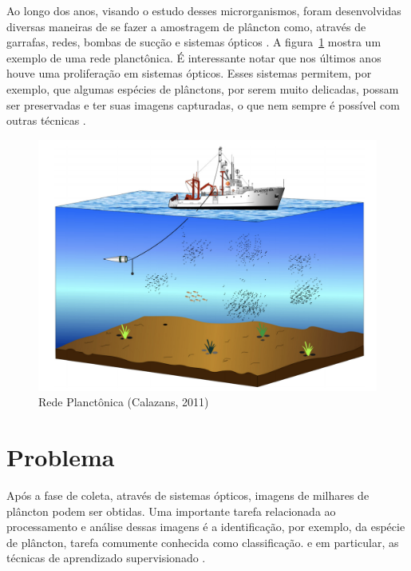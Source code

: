 Ao longo dos anos, visando o estudo desses microrganismos, foram desenvolvidas diversas maneiras de se fazer a amostragem de plâncton como, através de garrafas, redes, bombas de sucção e sistemas ópticos \citep{calazans2011organismos}. A figura~\ref{fig:amostragem_planctons} mostra um exemplo de uma rede planctônica. É interessante notar que nos últimos anos houve uma proliferação em sistemas ópticos. Esses sistemas permitem, por exemplo, que algumas espécies de plânctons, por serem muito delicadas, possam ser preservadas e ter suas imagens capturadas, o que nem sempre é possível com outras técnicas \citep{benfield2007rapid}.


\begin{figure}
  \centering
  \includegraphics[width=.8\textwidth]{figures/amostragem_planctons.png}
  \caption{Rede Planctônica (Calazans, 2011)}
  \label{fig:amostragem_planctons}
\end{figure}


\section{Problema}
\label{sec:intro_problema}

Após a fase de coleta, através de sistemas ópticos, imagens de milhares de plâncton podem ser obtidas. Uma importante tarefa relacionada ao processamento e análise dessas imagens é a identificação, por exemplo, da espécie de plâncton, tarefa comumente conhecida como classificação.  e em particular, as técnicas de aprendizado supervisionado \citep{jeffries1980computer, jeffries1984automated, berman1990image, tang1998automatic, luo2003learning, davis2004real, grosjean2004enumeration, luo2005active, hu2005automatic, blaschko2005automatic, hu2006accurate, sosik2007automated, bell2008assessment, soh2008segmentation, al2016plankton, luo2017automated, al2018intelligent}.


